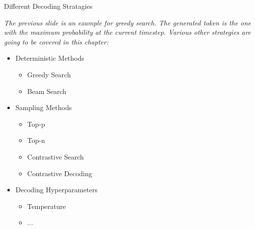 
\begin{vbframe}{Different Decoding Stratagies}

\textit{The previous slide is an example for greedy search. The generated token is the one with the maximum probability at the current timestep. Various other strategies are going to be covered in this chapter:}

\vfill

\begin{itemize}
    \item Deterministic Methods
    \begin{itemize}
        \item Greedy Search
        \item Beam Search
    \end{itemize}
    \item Sampling Methods
    \begin{itemize}
        \item Top-p
        \item Top-n
        \item Contrastive Search
        \item Contrastive Decoding
    \end{itemize}
    \item Decoding Hyperparameters
    \begin{itemize}
        \item Temperature
        \item ...
    \end{itemize}
\end{itemize}

\vfill
    
\end{vbframe}


\endlecture
